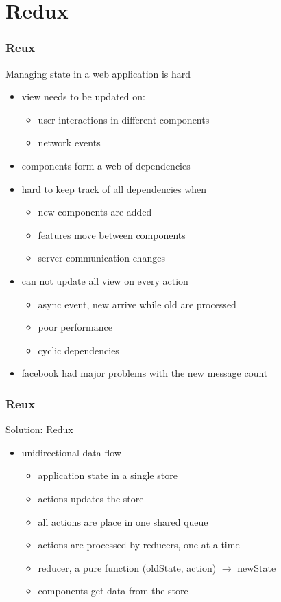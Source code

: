 \section{Redux}
\begin{frame}[fragile]\frametitle{Reux}
Managing state in a web application is hard
\begin{itemize}\color{structure}
  \item view needs to be updated on:
  \begin{itemize}
    \item user interactions in different components
    \item network events
  \end{itemize}
  \item components form a web of dependencies
  \item hard to keep track of all dependencies when
  \begin{itemize}
    \item new components are added
    \item features move between components
    \item server communication changes
  \end{itemize}
  \item can not update all view on every action
  \begin{itemize}
    \item async event, new arrive while old are processed
    \item poor performance
    \item cyclic dependencies
  \end{itemize}
  \item facebook had major problems with the new message count
\end{itemize}
\end{frame}

\begin{frame}[fragile]\frametitle{Reux}
Solution: Redux
\begin{itemize}\color{structure}
  \item unidirectional data flow
  \begin{itemize}
    \item application state in a single store
    \item actions updates the store
    \item all actions are place in one shared queue
    \item actions are processed by reducers, one at a time
    \item reducer, a pure function (oldState, action) $\rightarrow$ newState
    \item components get data from the store
  \end{itemize}
\end{itemize}
\end{frame}

